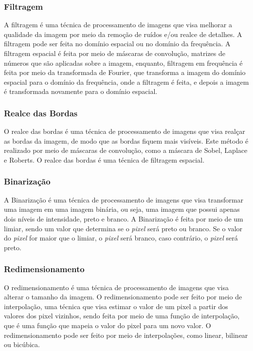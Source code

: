 \documentclass[conference]{IEEEtran}
\begin{document}
\subsubsection{Filtragem}

A filtragem é uma técnica de processamento de imagens que visa melhorar a qualidade da imagem por meio da 
remoção de ruídos e/ou realce de detalhes. A filtragem pode ser feita no domínio espacial ou no domínio da 
frequência. A filtragem espacial é feita por meio de máscaras de convolução, matrizes de números que são aplicadas 
sobre a imagem, enquanto, filtragem em frequência é feita por meio da transformada de Fourier, que transforma a 
imagem do domínio espacial para o domínio da frequência, onde a filtragem é feita, e depois a imagem é transformada novamente para o domínio espacial.

\subsubsection{Realce das Bordas}
O realce das bordas é uma técnica de processamento de imagens que visa realçar as bordas da imagem, 
de modo que as bordas fiquem mais visíveis. Este método é realizado por meio de máscaras de convolução, 
como a máscara de Sobel, Laplace e Roberts. O realce das bordas é uma técnica de filtragem espacial.

\subsubsection{Binarização}
A Binarização é uma técnica de processamento de imagens que visa transformar uma imagem em uma imagem binária, 
ou seja, uma imagem que possui apenas dois níveis de intensidade, preto e branco. A Binarização é feita por 
meio de um limiar, sendo um valor que determina se o \emph{pixel} será preto ou branco. Se o valor do \emph{pixel} 
for maior que o limiar, o \emph{pixel} será branco, caso contrário, o \emph{pixel} será preto.

\subsubsection{Redimensionamento}
O redimensionamento é uma técnica de processamento de imagens que visa alterar o tamanho da imagem. 
O redimensionamento pode ser feito por meio de interpolação, uma técnica que visa estimar o valor de um pixel 
a partir dos valores dos pixel vizinhos, sendo feita por meio de uma função de interpolação, 
que é uma função que mapeia o valor do pixel para um novo valor. 
O redimensionamento pode ser feito por meio de interpolações, como linear, bilinear ou bicúbica.
\end{document}
